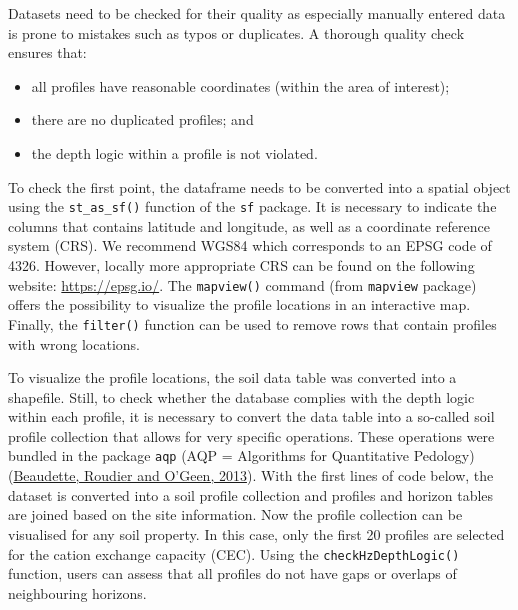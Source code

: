 \documentclass[
  10pt,
  b5paper,
  oneside]{book}
\providecommand{\tightlist}{%
  \setlength{\itemsep}{0pt}\setlength{\parskip}{0pt}}
\begin{document}
Datasets need to be checked for their quality as especially manually entered data is prone to mistakes such as typos or duplicates. A thorough quality check ensures that:

\begin{itemize}
\tightlist
\item
  all profiles have reasonable coordinates (within the area of interest);
\item
  there are no duplicated profiles; and
\item
  the depth logic within a profile is not violated.
\end{itemize}

To check the first point, the dataframe needs to be converted into a spatial object using the \texttt{st\_as\_sf()} function of the \texttt{sf} package. It is necessary to indicate the columns that contains latitude and longitude, as well as a coordinate reference system (CRS). We recommend WGS84 which corresponds to an EPSG code of 4326. However, locally more appropriate CRS can be found on the following website: \url{https://epsg.io/}. The \texttt{mapview()} command (from \texttt{mapview} package) offers the possibility to visualize the profile locations in an interactive map. Finally, the \texttt{filter()} function can be used to remove rows that contain profiles with wrong locations.

To visualize the profile locations, the soil data table was converted into a shapefile. Still, to check whether the database complies with the depth logic within each profile, it is necessary to convert the data table into a so-called soil profile collection that allows for very specific operations. These operations were bundled in the package \texttt{aqp} (AQP = Algorithms for Quantitative Pedology) (\protect\hyperlink{ref-beaudette2013}{Beaudette, Roudier and O'Geen, 2013}).
With the first lines of code below, the dataset is converted into a soil profile collection and profiles and horizon tables are joined based on the site information.
Now the profile collection can be visualised for any soil property. In this case, only the first 20 profiles are selected for the cation exchange capacity (CEC).
Using the \texttt{checkHzDepthLogic()} function, users can assess that all profiles do not have gaps or overlaps of neighbouring horizons.
\end{document}
